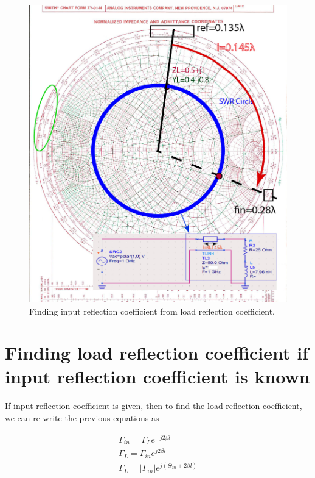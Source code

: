 \documentclass{ximera}
\begin{document}
\begin{figure}[htbp]
\begin{center}
\includegraphics[scale=0.8]{../jpg/InputImpedance2-01.jpg}
\end{center}
\caption{Finding input reflection coefficient from load reflection coefficient.}
\label{fig:SCImpRefCoeff}
\end{figure}

\newpage
\section{Finding load reflection coefficient if input reflection coefficient is known}

If input reflection coefficient is given, then to find the load reflection coefficient, we can re-write the previous equations as


\begin{eqnarray}
\Gamma_{in}=\Gamma_L e^{-j2 \beta l} \\
\Gamma_{L} = \Gamma_{in}  e^{j2 \beta l} \\
\Gamma_{L} = |\Gamma_{in}| e^{j(\Theta_{in} +2 \beta l) } 
\end{eqnarray}
\end{document}
